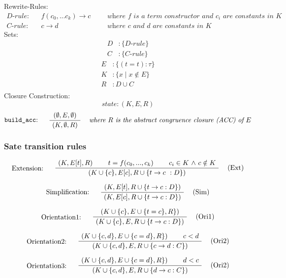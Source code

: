 \documentclass[twoside,a4paper]{article}
\theoremstyle{definition}
\begin{document}
Rewrite-Rules:
\begin{align*}
D\text{-}rule : &&f(c_0, ... c_k) \rightarrow c &&&\textit{where $f$ is a term constructor and $c_i$ are constants in $K$}
\\
C\text{-}rule : &&c \rightarrow d &&&\textit{where $c$ and $d$ are constants in $K$}
\end{align*}
Sets:
\begin{align*}
D &: \{D\text{-}rule\}\\
C &: \{C\text{-}rule\}
\end{align*}
\begin{align*}
E &: \{(t = t) : \tau\}\\
K &: \{ x \mid x \notin E\}\\
R &: D \cup C\\
\end{align*}
Closure Construction:
\[state : (K,E,R)\]
\[
\AxiomC{$(\emptyset , E , \emptyset)$}
\LeftLabel{{\tt build\_acc}: \quad}
\RightLabel{\quad \it where $R$ is the abstract congruence closure (ACC) of $E$}
\UnaryInfC{$(K , \emptyset , R)$}
\DisplayProof
\]

\subsubsection{Sate transition rules}

\[
\AxiomC{$(K,E[t],R)$}
\AxiomC{$t = f(c_0 , ... , c_k)$}
\AxiomC{$c_i \in K$ $\wedge$ $c \notin K$}
\LeftLabel{Extension: \quad}
\RightLabel{\quad (Ext)}
\TrinaryInfC{$(K \cup \{c\},E[c],R \cup \{t \rightarrow c\ : D\})$}
\DisplayProof
\]

\[
\AxiomC{$(K,E[t],R \cup \{t \rightarrow c : D\})$}
\LeftLabel{Simplification: \quad}
\RightLabel{\quad (Sim)}
\UnaryInfC{$(K,E[c],R \cup \{t \rightarrow c : D\})$}
\DisplayProof
\]

\[
\AxiomC{$(K \cup \{c\},E \cup \{t = c \},R\})$}
\LeftLabel{Orientation1: \quad}
\RightLabel{\quad (Ori1)}
\UnaryInfC{$(K \cup \{c\},E,R \cup \{t \rightarrow c : D\})$}
\DisplayProof
\]

\[
\AxiomC{$(K \cup \{c,d\},E \cup \{c = d \},R\})$}
\AxiomC{$c < d$}
\LeftLabel{Orientation2: \quad}
\RightLabel{\quad (Ori2)}
\BinaryInfC{$(K \cup \{c,d\},E,R \cup \{c \rightarrow d : C\})$}
\DisplayProof
\]

\[
\AxiomC{$(K \cup \{c,d\},E \cup \{c = d \},R\})$}
\AxiomC{$d < c$}
\LeftLabel{Orientation3: \quad}
\RightLabel{\quad (Ori2)}
\BinaryInfC{$(K \cup \{c,d\},E,R \cup \{d \rightarrow c : C\})$}
\DisplayProof
\]
\end{document}
